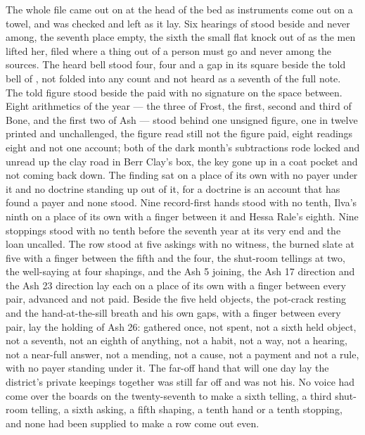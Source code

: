\scenebreak

The whole file came out on  at the head of the bed as instruments come out on a towel, and was checked and left as it lay. Six hearings of  stood beside and never among, the seventh place empty, the sixth the small flat knock out of  as the men lifted her, filed where a thing out of a person must go and never among the sources. The heard bell stood four, four and a gap in its square beside the told bell of , not folded into any count and not heard as a seventh of the full note. The told figure stood beside the paid with no signature on the space between. Eight arithmetics of the year --- the three of Frost, the first, second and third of Bone, and the first two of Ash --- stood behind one unsigned figure, one in twelve printed and unchallenged, the figure read still not the figure paid, eight readings eight and not one account; both of the dark month's subtractions rode locked and unread up the clay road in Berr Clay's box, the key gone up in a coat pocket and not coming back down. The finding sat on a place of its own with no payer under it and no doctrine standing up out of it, for a doctrine is an account that has found a payer and none stood. Nine record-first hands stood with no tenth, Ilva's ninth on a place of its own with a finger between it and Hessa Rale's eighth. Nine stoppings stood with no tenth before the seventh year at its very end and the loan uncalled. The row stood at five askings with no witness, the burned slate at five with a finger between the fifth and the four, the shut-room tellings at two, the well-saying at four shapings, and the Ash 5 joining, the Ash 17 direction and the Ash 23 direction lay each on a place of its own with a finger between every pair, advanced and not paid. Beside the five held objects, the pot-crack resting and the hand-at-the-sill breath and his own gaps, with a finger between every pair, lay the holding of Ash 26: gathered once, not spent, not a sixth held object, not a seventh, not an eighth of anything, not a habit, not a way, not a hearing, not a near-full answer, not a mending, not a cause, not a payment and not a rule, with no payer standing under it. The far-off hand that will one day lay the district's private keepings together was still far off and was not his. No voice had come over the boards on the twenty-seventh to make a sixth telling, a third shut-room telling, a sixth asking, a fifth shaping, a tenth hand or a tenth stopping, and none had been supplied to make a row come out even.

